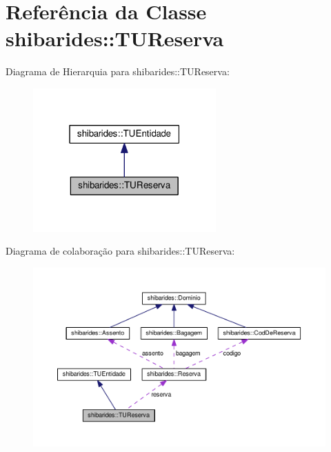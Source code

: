 \hypertarget{classshibarides_1_1TUReserva}{}\section{Referência da Classe shibarides\+:\+:T\+U\+Reserva}
\label{classshibarides_1_1TUReserva}


Diagrama de Hierarquia para shibarides\+:\+:T\+U\+Reserva\+:\nopagebreak
\begin{figure}[H]
\begin{center}
\leavevmode
\includegraphics[width=199pt]{classshibarides_1_1TUReserva__inherit__graph}
\end{center}
\end{figure}


Diagrama de colaboração para shibarides\+:\+:T\+U\+Reserva\+:\nopagebreak
\begin{figure}[H]
\begin{center}
\leavevmode
\includegraphics[width=350pt]{classshibarides_1_1TUReserva__coll__graph}
\end{center}
\end{figure}
